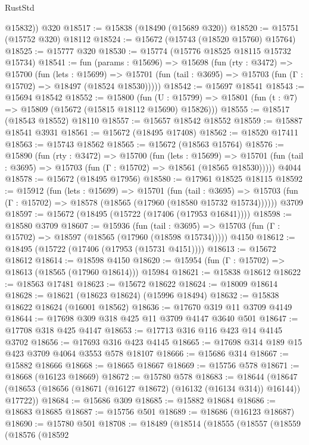 \begin{lexlean}{RustStd}
\begin{coremodule}
        @15832))
    @320
@18517 := @15838 (@18490 (@15689 @320))
@18520 := @15751 (@15752 @320) @18112
@18524 := @15672 (@15743 (@18520 @15760) @15764)
@18525 := @15777 @320
@18530 := @15774 (@15776 @18525 @18115 @15732 @15734)
@18541 := fun (params : @15696) =>
  @15698
    (fun (rty : @3472) =>
    @15700
      (fun (lets : @15699) =>
      @15701 (fun (tail : @3695) => @15703 (fun (Γ : @15702) => @18497 (@18524 @18530)))))
@18542 := @15697 @18541
@18543 := @15694 @18542
@18552 := @15800
    (fun (U : @15799) => @15801 (fun (t : @7) => @15809 (@15672 (@15815 @18112 @15690) @15826)))
@18555 := @18517 (@18543 @18552) @18110
@18557 := @15657 @18542 @18552
@18559 := @15887 @18541 @3931
@18561 := @15672 (@18495 @17408)
@18562 := @18520 @17411
@18563 := @15743 @18562
@18565 := @15672 (@18563 @15764)
@18576 := @15890
    (fun (rty : @3472) =>
    @15700
      (fun (lets : @15699) =>
      @15701 (fun (tail : @3695) => @15703 (fun (Γ : @15702) => @18561 (@18565 @18530)))))
    @4044
@18578 := @15672 (@18495 @17956)
@18580 := @17961 @18525 @18115
@18592 := @15912
    (fun (lets : @15699) =>
    @15701
      (fun (tail : @3695) =>
      @15703 (fun (Γ : @15702) => @18578 (@18565 (@17960 (@18580 @15732 @15734))))))
    @3709
@18597 := @15672 (@18495 (@15722 (@17406 (@17953 @16841))))
@18598 := @18580 @3709
@18607 := @15936
    (fun (tail : @3695) => @15703 (fun (Γ : @15702) => @18597 (@18565 (@17960 (@18598 @15734)))))
    @4150
@18612 := @18495 (@15722 (@17406 (@17953 (@15731 @4151))))
@18613 := @15672 @18612
@18614 := @18598 @4150
@18620 := @15954 (fun (Γ : @15702) => @18613 (@18565 (@17960 @18614))) @15984
@18621 := @15838 @18612
@18622 := @18563 @17481
@18623 := @15672 @18622
@18624 := @18009 @18614
@18628 := @18621 (@18623 @18624) (@15996 @18494)
@18632 := @15838 @18622 @18624 (@16001 @18562)
@18636 := @17670 @319 @11 @3709 @4149
@18644 := @17698 @309 @318 @425 @11 @3709 @4147 @3640 @501
@18647 := @17708 @318 @425 @4147
@18653 := @17713 @316 @116 @423 @14 @4145 @3702
@18656 := @17693 @316 @423 @4145
@18665 := @17698 @314 @189 @15 @423 @3709 @4064 @3553 @578 @18107
@18666 := @15686 @314
@18667 := @15882 @18666
@18668 := @18665 @18667
@18669 := @15756 @578
@18671 := @18668 (@16123 @18669)
@18672 := @15780 @578
@18683 := @18644
    (@18647 (@18653 (@18656 (@18671 (@16127 @18672) (@16132 (@16134 @314)) @16144)) @17722))
@18684 := @15686 @309
@18685 := @15882 @18684
@18686 := @18683 @18685
@18687 := @15756 @501
@18689 := @18686 (@16123 @18687)
@18690 := @15780 @501
@18708 := @18489
    (@18514
      (@18555
        (@18557
          (@18559
            (@18576
              (@18592

\end{coremodule}
\end{lexlean}
